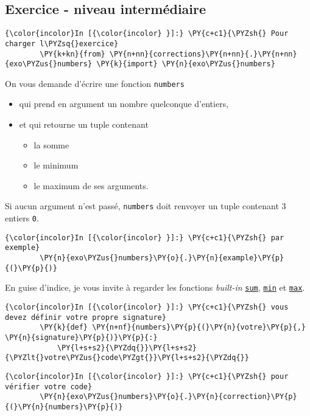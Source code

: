     \hypertarget{exercice---niveau-intermuxe9diaire}{%
\subsection{Exercice - niveau
intermédiaire}\label{exercice---niveau-intermuxe9diaire}}

    \begin{Verbatim}[commandchars=\\\{\}]
{\color{incolor}In [{\color{incolor} }]:} \PY{c+c1}{\PYZsh{} Pour charger l\PYZsq{}exercice}
        \PY{k+kn}{from} \PY{n+nn}{corrections}\PY{n+nn}{.}\PY{n+nn}{exo\PYZus{}numbers} \PY{k}{import} \PY{n}{exo\PYZus{}numbers}
\end{Verbatim}


    On vous demande d'écrire une fonction \texttt{numbers}
    
\begin{itemize}
	\item 
	qui prend en argument un nombre quelconque d'entiers,
	\item
	et qui retourne un tuple contenant
	\begin{itemize}
		\item 
		la somme
		\item
		le minimum
		\item
		le maximum de ses arguments.
	\end{itemize}
\end{itemize}

    Si aucun argument n'est passé, \texttt{numbers} doit renvoyer un tuple
contenant 3 entiers \texttt{0}.

    \begin{Verbatim}[commandchars=\\\{\}]
{\color{incolor}In [{\color{incolor} }]:} \PY{c+c1}{\PYZsh{} par exemple}
        \PY{n}{exo\PYZus{}numbers}\PY{o}{.}\PY{n}{example}\PY{p}{(}\PY{p}{)}
\end{Verbatim}


    En guise d'indice, je vous invite à regarder les fonctions
\emph{built-in}
\href{https://docs.python.org/3/library/functions.html\#sum}{\texttt{sum}},
\href{https://docs.python.org/3/library/functions.html\#min}{\texttt{min}}
et
\href{https://docs.python.org/3/library/functions.html\#max}{\texttt{max}}.

    \begin{Verbatim}[commandchars=\\\{\}]
{\color{incolor}In [{\color{incolor} }]:} \PY{c+c1}{\PYZsh{} vous devez définir votre propre signature}
        \PY{k}{def} \PY{n+nf}{numbers}\PY{p}{(}\PY{n}{votre}\PY{p}{,} \PY{n}{signature}\PY{p}{)}\PY{p}{:}
            \PY{l+s+s2}{\PYZdq{}}\PY{l+s+s2}{\PYZlt{}votre\PYZus{}code\PYZgt{}}\PY{l+s+s2}{\PYZdq{}}
\end{Verbatim}


    \begin{Verbatim}[commandchars=\\\{\}]
{\color{incolor}In [{\color{incolor} }]:} \PY{c+c1}{\PYZsh{} pour vérifier votre code}
        \PY{n}{exo\PYZus{}numbers}\PY{o}{.}\PY{n}{correction}\PY{p}{(}\PY{n}{numbers}\PY{p}{)}
\end{Verbatim}
